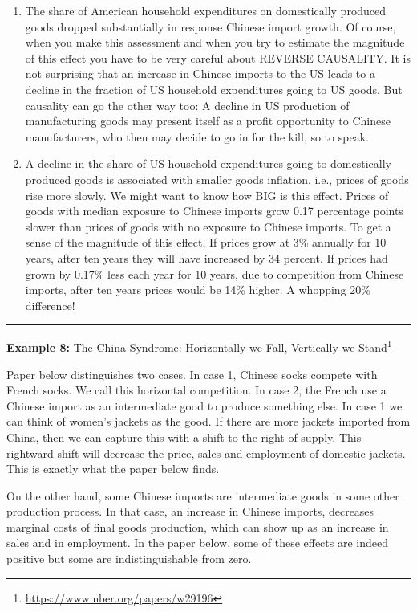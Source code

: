 \documentclass[
]{book}
\begin{document}
\begin{enumerate}
\def\labelenumi{\arabic{enumi}.}
\item
  The share of American household expenditures on domestically produced goods dropped substantially in response Chinese import growth. Of course, when you make this assessment and when you try to estimate the magnitude of this effect you have to be very careful about REVERSE CAUSALITY. It is not surprising that an increase in Chinese imports to the US leads to a decline in the fraction of US household expenditures going to US goods. But causality can go the other way too: A decline in US production of manufacturing goods may present itself as a profit opportunity to Chinese manufacturers, who then may decide to go in for the kill, so to speak.
\item
  A decline in the share of US household expenditures going to domestically produced goods is associated with smaller goods inflation, i.e., prices of goods rise more slowly. We might want to know how BIG is this effect. Prices of goods with median exposure to Chinese imports grow 0.17 percentage points slower than prices of goods with no exposure to Chinese imports. To get a sense of the magnitude of this effect, If prices grow at 3\% annually for 10 years, after ten years they will have increased by 34 percent. If prices had grown by 0.17\% less each year for 10 years, due to competition from Chinese imports, after ten years prices would be 14\% higher. A whopping 20\% difference!
\end{enumerate}

\begin{center}\rule{0.5\linewidth}{0.5pt}\end{center}

\textbf{Example 8:} The China Syndrome: Horizontally we Fall, Vertically we Stand\footnote{\url{https://www.nber.org/papers/w29196}}

Paper below distinguishes two cases. In case 1, Chinese socks compete with French socks. We call this horizontal competition. In case 2, the French use a Chinese import as an intermediate good to produce something else. In case 1 we can think of women's jackets as the good. If there are more jackets imported from China, then we can capture this with a shift to the right of supply. This rightward shift will decrease the price, sales and employment of domestic jackets. This is exactly what the paper below finds.

On the other hand, some Chinese imports are intermediate goods in some other production process. In that case, an increase in Chinese imports, decreases marginal costs of final goods production, which can show up as an increase in sales and in employment. In the paper below, some of these effects are indeed positive but some are indistinguishable from zero.
\end{document}
